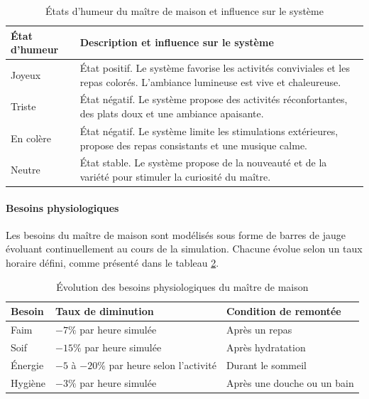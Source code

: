 \begin{table}[h!]
\centering
\begin{tabular}{|p{3cm}|p{9cm}|}
\hline
\textbf{État d'humeur} & \textbf{Description et influence sur le système} \\
\hline
Joyeux & État positif. Le système favorise les activités conviviales et les repas 
colorés. L'ambiance lumineuse est vive et chaleureuse. \\
\hline
Triste & État négatif. Le système propose des activités réconfortantes, 
des plats doux et une ambiance apaisante. \\
\hline
En colère & État négatif. Le système limite les stimulations extérieures, 
propose des repas consistants et une musique calme. \\
\hline
Neutre & État stable. Le système propose de la nouveauté et de la variété 
pour stimuler la curiosité du maître. \\
\hline
\end{tabular}
\caption{États d'humeur du maître de maison et influence sur le système}
\label{tab:humeurs}
\end{table}

\paragraph{Besoins physiologiques} Les besoins du maître de maison sont modélisés sous 
forme de barres de jauge évoluant continuellement au cours de la simulation. Chacune 
évolue selon un taux horaire défini, comme présenté dans le tableau \ref{tab:besoins}.

\begin{table}[h!]
\centering
\begin{tabular}{|p{3cm}|p{4cm}|p{5cm}|}
\hline
\textbf{Besoin} & \textbf{Taux de diminution} & \textbf{Condition de remontée} \\
\hline
Faim & $-7\%$ par heure simulée & Après un repas \\
\hline
Soif & $-15\%$ par heure simulée & Après hydratation \\
\hline
Énergie & $-5$ à $-20\%$ par heure selon l'activité & Durant le sommeil \\
\hline
Hygiène & $-3\%$ par heure simulée & Après une douche ou un bain \\
\hline
\end{tabular}
\caption{Évolution des besoins physiologiques du maître de maison}
\label{tab:besoins}
\end{table}

